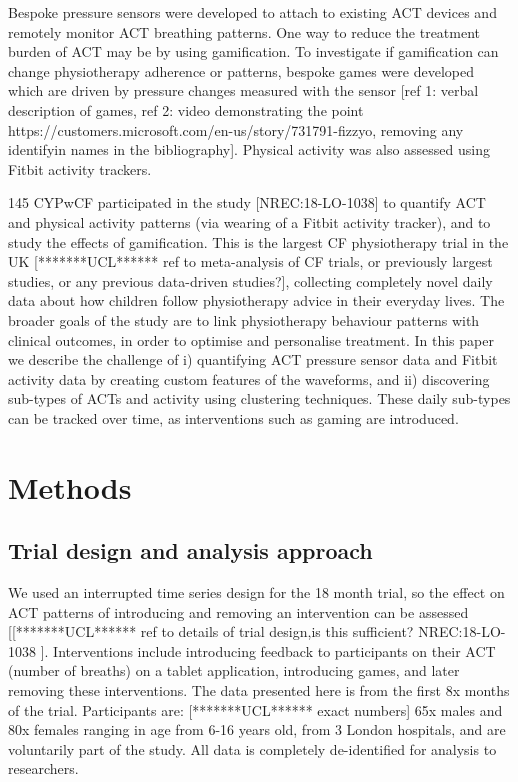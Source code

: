 \documentclass{article}
\begin{document}
Bespoke pressure sensors were developed to attach to existing ACT devices and remotely monitor ACT breathing patterns. One way to reduce the treatment burden of ACT may be by using gamification. To investigate if gamification can change physiotherapy adherence or patterns, bespoke games were developed which are driven by pressure changes measured with the sensor [ref 1: verbal description of games, ref 2: video demonstrating the point https://customers.microsoft.com/en-us/story/731791-fizzyo, removing any identifyin names in the bibliography]. Physical activity was also assessed using Fitbit activity trackers. 

 145 CYPwCF participated in the study [NREC:18-LO-1038] to quantify ACT and physical activity patterns (via wearing of a Fitbit activity tracker), and to study the effects of gamification. This is the largest CF physiotherapy trial in the UK [*******UCL****** ref to meta-analysis of CF trials, or previously largest studies, or any previous data-driven studies?], collecting completely novel daily data about how children follow physiotherapy advice in their everyday lives. The broader goals of the study are to link physiotherapy behaviour patterns with clinical outcomes, in order to optimise and personalise treatment. In this paper we describe the challenge of i) quantifying ACT pressure sensor data and Fitbit activity data by creating custom features of the waveforms, and ii) discovering sub-types of ACTs and activity using clustering techniques. These daily sub-types can be tracked over time, as interventions such as gaming are introduced.   
\section{Methods}
\subsection{Trial design and analysis approach}
We used an interrupted time series design for the 18 month trial, so the effect on ACT patterns of introducing and removing an intervention can be assessed [[*******UCL****** ref to details of trial design,is this sufficient? NREC:18-LO-1038 ]. Interventions include introducing feedback to participants on their ACT (number of breaths) on a tablet application, introducing games, and later removing these interventions. The data presented here is from the first 8x months of the trial. Participants are: [*******UCL****** exact numbers] 65x males and 80x females ranging in age from 6-16 years old, from 3 London hospitals, and are voluntarily part of the study. All data is completely de-identified for analysis to researchers. 
 
\end{document}

